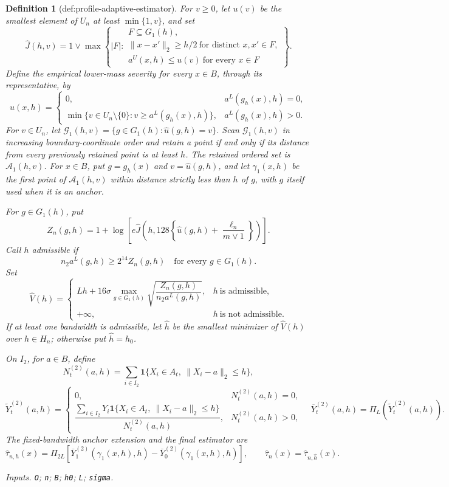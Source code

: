 \documentclass{article}
\newtheorem{definition}{Definition}
\begin{document}
\begin{definition}[def:profile-adaptive-estimator]
For \(v\geq0\), let \(u(v)\) be the smallest element of \(U_n\) at least
\(\min\{1,v\}\), and set
\[
 \widehat J(h,v)=1\vee\max\left\{|F|:
 \begin{array}{l}
 F\subseteq G_1(h),\\
 \|x-x'\|_2\geq h/2\ \text{for distinct }x,x'\in F,\\
 a^U(x,h)\leq u(v)\ \text{for every }x\in F
 \end{array}\right\}.
\]
Define the empirical lower-mass severity for every \(x\in B\), through its representative, by
\[
 \widehat u(x,h)=
 \begin{cases}
 0,&a^L(g_h(x),h)=0,\\
 \min\{v\in U_n\setminus\{0\}:v\geq a^L(g_h(x),h)\},&a^L(g_h(x),h)>0.
 \end{cases}
\]
For \(v\in U_n\), let
\(\mathcal G_1(h,v)=\{g\in G_1(h):\widehat u(g,h)=v\}\).
Scan \(\mathcal G_1(h,v)\) in increasing boundary-coordinate order and
retain a point if and only if its distance from every previously retained
point is at least \(h\).  The retained ordered set is
\(\mathcal A_1(h,v)\).  For \(x\in B\), put \(g=g_h(x)\) and
\(v=\widehat u(g,h)\), and let \(\gamma_1(x,h)\) be the first point of
\(\mathcal A_1(h,v)\) within distance strictly less than \(h\) of \(g\),
with \(g\) itself used when it is an anchor.

For \(g\in G_1(h)\), put
\[
 Z_n(g,h)=1+\log\!\left[
 e\widehat J\!\left(
 h,128\left\{\widehat u(g,h)+\frac{\ell_n}{m\vee1}\right\}\right)\right].
\]
Call \(h\) admissible if
\[
 n_2a^L(g,h)\geq2^{14}Z_n(g,h)
 \quad\text{for every }g\in G_1(h).
\]
Set
\[
 \widehat V(h)=
 \begin{cases}
 Lh+16\sigma\displaystyle\max_{g\in G_1(h)}
 \sqrt{\dfrac{Z_n(g,h)}{n_2a^L(g,h)}},
 &h\ \text{is admissible},\\[2ex]
 +\infty,&h\ \text{is not admissible}.
 \end{cases}
\]
If at least one bandwidth is admissible, let \(\widehat h\) be the smallest
minimizer of \(\widehat V(h)\) over \(h\in H_n\); otherwise put
\(\widehat h=h_0\).

On \(I_2\), for \(a\in B\), define
\[
 N^{(2)}_t(a,h)=\sum_{i\in I_2}
 \mathbf1\{X_i\in A_t,\ \|X_i-a\|_2\leq h\},
\]
\[
 \widetilde Y^{(2)}_t(a,h)=
 \begin{cases}
 0,&N^{(2)}_t(a,h)=0,\\[1ex]
 \dfrac{\sum_{i\in I_2}Y_i
 \mathbf1\{X_i\in A_t,\ \|X_i-a\|_2\leq h\}}
 {N^{(2)}_t(a,h)},&N^{(2)}_t(a,h)>0,
 \end{cases}
\quad
 \overline Y^{(2)}_t(a,h)=\Pi_L(\widetilde Y^{(2)}_t(a,h)).
\]
The fixed-bandwidth anchor extension and the final estimator are
\[
 \widehat\tau_{n,h}(x)=
 \Pi_{2L}\!\left[
 \overline Y^{(2)}_1(\gamma_1(x,h),h)
 -\overline Y^{(2)}_0(\gamma_1(x,h),h)\right],
 \qquad
 \widehat\tau_n(x)=\widehat\tau_{n,\widehat h}(x).
\]
\par\smallskip\noindent\emph{Inputs.} \texttt{O}; \texttt{n}; \texttt{B}; \texttt{h0}; \texttt{L}; \texttt{sigma}.
\end{definition}
\end{document}
